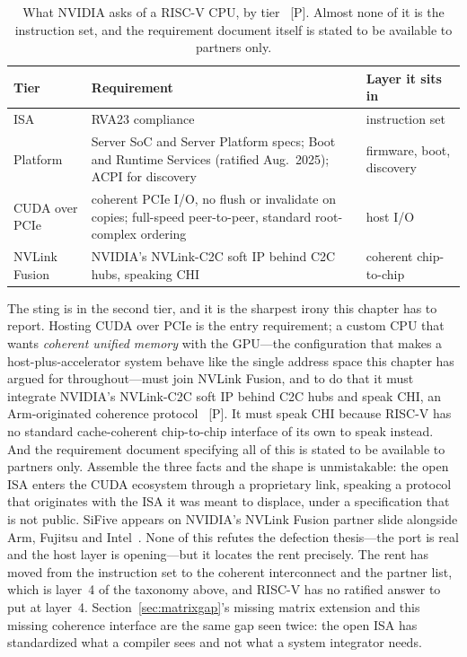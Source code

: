 \begin{table}[htbp]
  \centering
  \small
  \caption{What NVIDIA asks of a RISC-V CPU, by tier~\cite{hc2026-nv-riscv} [P]. Almost none of it is the instruction set, and the requirement document itself is stated to be available to partners only.}
  \label{tab:cudariscv}
  \setlength{\tabcolsep}{4pt}
  \begin{tabular}{>{\raggedright\arraybackslash}p{27mm}>{\raggedright\arraybackslash}p{50mm}>{\raggedright\arraybackslash}p{40mm}}
    \toprule
    Tier & Requirement & Layer it sits in \\
    \midrule
    ISA & RVA23 compliance & instruction set \\
    \addlinespace
    Platform & Server SoC and Server Platform specs; Boot and Runtime Services (ratified Aug.\ 2025); ACPI for discovery & firmware, boot, discovery \\
    \addlinespace
    CUDA over PCIe & coherent PCIe I/O, no flush or invalidate on copies; full-speed peer-to-peer, standard root-complex ordering & host I/O \\
    \addlinespace
    NVLink Fusion & NVIDIA's NVLink-C2C soft IP behind C2C hubs, speaking CHI & coherent chip-to-chip \\
    \bottomrule
  \end{tabular}
\end{table}

The sting is in the second tier, and it is the sharpest irony this chapter has to report. Hosting CUDA over PCIe is the entry requirement; a custom CPU that wants \emph{coherent unified memory} with the GPU---the configuration that makes a host-plus-accelerator system behave like the single address space this chapter has argued for throughout---must join NVLink Fusion, and to do that it must integrate NVIDIA's NVLink-C2C soft IP behind C2C hubs and speak CHI, an Arm-originated coherence protocol~\cite{hc2026-nv-riscv} [P]. It must speak CHI because RISC-V has no standard cache-coherent chip-to-chip interface of its own to speak instead. And the requirement document specifying all of this is stated to be available to partners only. Assemble the three facts and the shape is unmistakable: the open ISA enters the CUDA ecosystem through a proprietary link, speaking a protocol that originates with the ISA it was meant to displace, under a specification that is not public. SiFive appears on NVIDIA's NVLink Fusion partner slide alongside Arm, Fujitsu and Intel~\cite{hc2026-nv-riscv}. None of this refutes the defection thesis---the port is real and the host layer is opening---but it locates the rent precisely. The rent has moved from the instruction set to the coherent interconnect and the partner list, which is layer~4 of the taxonomy above, and RISC-V has no ratified answer to put at layer~4. Section~\ref{sec:matrixgap}'s missing matrix extension and this missing coherence interface are the same gap seen twice: the open ISA has standardized what a compiler sees and not what a system integrator needs.

